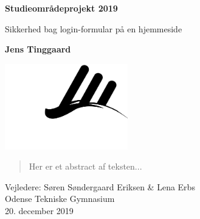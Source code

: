\begin{titlepage}
   \begin{center}

       \Large
       \textbf{Studieområdeprojekt 2019}

        \vspace{0.5cm}
        \large
        Sikkerhed bag login-formular på en hjemmeside

       \vspace{1cm}
       \large
       \textbf{Jens Tinggaard}

       \vspace{1cm}
       {\hspace{-2cm}\includegraphics[width=0.4\textwidth]{img/otg_logo.png}}

       \vspace{-0.5cm}
       \begin{abstract}
           Her er et abstract af teksten...
       \end{abstract}

       \vfill

       Vejledere: Søren Søndergaard Eriksen \& Lena Erbs\\
       Odense Tekniske Gymnasium\\
       20. december 2019
   \end{center}
\end{titlepage}
